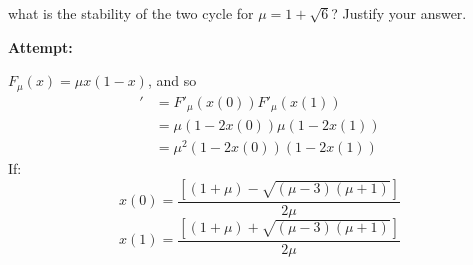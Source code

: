 \documentclass[12pt,letterpaper]{article}
\theoremstyle{definition}
\begin{document}
what is the stability of the two cycle for $\mu = 1 +\sqrt{6}$? Justify your answer.

\textbf{Attempt:}
\begin{changemargin}{.5cm}{0cm}
    $F_\mu (x) = \mu x(1-x)$, and so 
    \begin{align*}
        [F^2_\mu(x(0)) ]' &= F'_\mu(x(0))F'_\mu(x(1))\\
        &=\mu(1-2x(0))\mu(1-2x(1))
        \\
       &=\mu^2(1-2x(0))(1-2x(1))
    \end{align*}
    If:
    \begin{equation*}
        x(0) = \frac{\left[ (1+\mu) -\sqrt{(\mu-3)(\mu+1)} \right]}{2\mu}
    \end{equation*}
    \begin{equation*}
        x(1) = \frac{\left[ (1+\mu) +\sqrt{(\mu-3)(\mu+1)} \right]}{2\mu}
    \end{equation*}


\end{changemargin}
\end{document}
